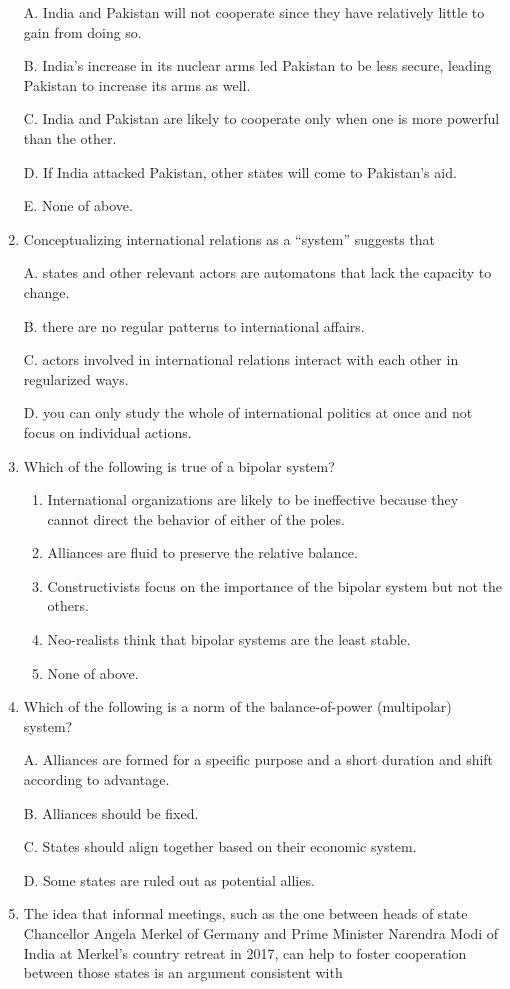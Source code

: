 \documentclass[
]{book}
\begin{document}
\begin{enumerate}
  A. India and Pakistan will not cooperate since they have relatively little to gain from doing so.

  B. India's increase in its nuclear arms led Pakistan to be less secure, leading Pakistan to increase its arms as well.

  C. India and Pakistan are likely to cooperate only when one is more powerful than the other.

  D. If India attacked Pakistan, other states will come to Pakistan's aid.

  E. None of above.
\item
  Conceptualizing international relations as a ``system'' suggests that

  A. states and other relevant actors are automatons that lack the capacity to change.

  B. there are no regular patterns to international affairs.

  C. actors involved in international relations interact with each other in regularized ways.

  D. you can only study the whole of international politics at once and not focus on individual actions.
\item
  Which of the following is true of a bipolar system?

  \begin{enumerate}
  \def\labelenumii{\Alph{enumii}.}
  \item
    International organizations are likely to be ineffective because they cannot direct the behavior of either of the poles.
  \item
    Alliances are fluid to preserve the relative balance.
  \item
    Constructivists focus on the importance of the bipolar system but not the others.
  \item
    Neo-realists think that bipolar systems are the least stable.
  \item
    None of above.
  \end{enumerate}
\item
  Which of the following is a norm of the balance-of-power (multipolar) system?

  A. Alliances are formed for a specific purpose and a short duration and shift according to advantage.

  B. Alliances should be fixed.

  C. States should align together based on their economic system.

  D. Some states are ruled out as potential allies.
\item
  The idea that informal meetings, such as the one between heads of state Chancellor Angela Merkel of Germany and Prime Minister Narendra Modi of India at Merkel's country retreat in 2017, can help to foster cooperation between those states is an argument consistent with


\end{enumerate}
\end{document}
